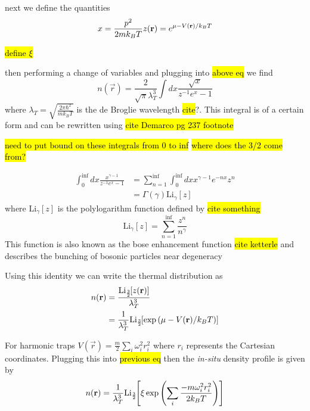 next we define the quantities 
\begin{equation}
x=\frac{p^2}{2mk_BT} \\
z(\vec{r}) = e^{\mu - V(\vec{r})/k_BT}
\end{equation}

\hl{define $\xi$}

then performing a change of variables and plugging into \hl{above eq} we find
	\begin{equation}
	n(\vec{r}) = \frac{2}{\sqrt{\pi} \lambda_T^3}\int dx \frac{\sqrt{x}}{z^{-1}e^x-1}
	\end{equation}
where $\lambda_T = \sqrt{\frac{2 \pi \hbar^2}{m k_B T}}$ is the de Broglie wavelength \hl{cite}?. This integral is of a certain form and can be rewritten using \hl{cite Demarco pg 237 footnote}

\hl{need to put bound on these integrals from 0 to inf}
\hl{where does the 3/2 come from?}

	\begin{equation}
	\begin{split}
	\int_0^{\inf}dx\frac{x^{\gamma-1}}{z^{-1}e^x-1} &= \sum_{n=1}^{\inf}\int_0^{\inf}dx x^{\gamma-1}e^{-nx}z^n \\
	&=\Gamma(\gamma)\text{Li}_{\gamma}[z]
	\end{split}
	\end{equation}
where $\text{Li}_{\gamma}[z]$ is the polylogarithm function defined by \hl{cite something}
	\begin{equation} \label{eq:polylog_def}
	\text{Li}_{\gamma}[z] = \sum_{n=1}^{\inf}\frac{z^n}{n^{\gamma}}
	\end{equation}
This function is also known as the bose enhancement function \hl{cite ketterle} and describes the bunching of bosonic particles near degeneracy

Using this identity we can write the thermal distribution as
	\begin{equation}
	\begin{split}
	n(\vec{r}) &= \frac{\Li{\ssfrac{3}{2}}{z(\vec{r})}}{\lambda_T^3} \\
				 &= \frac{1}{\lambda_T^3}\Li{\ssfrac{3}{2}}{\exp{\mu-V(\vec{r})/k_BT}}
	\end{split}
	\end{equation}

For harmonic traps $V(\vec{r}) = \frac{m}{2}\displaystyle\sum_i\omega_i^2r_i^2$ where $r_i$ represents the Cartesian coordinates. Plugging this into \hl{previous eq} then the \textit{in-situ} density profile is given by
\begin{equation}
n(\vec{r}) = \frac{1}{\lambda_T^3}\Li{\ssfrac{3}{2}}{\xi \,\exp{\sum_i\frac{-m\omega_i^2r_i^2}{2 k_B T}}}
\end{equation}

